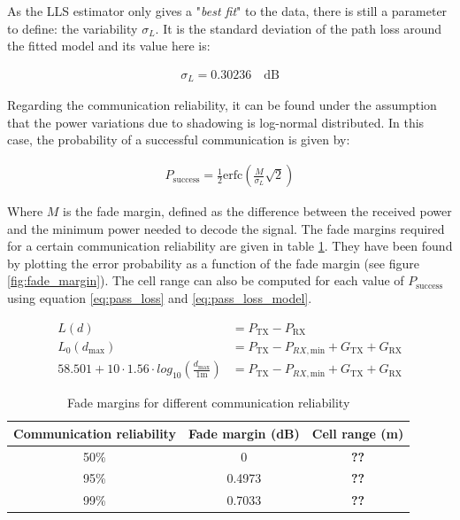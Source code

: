 \documentclass[10pt,a4paper]{ULBreport}
\begin{document}
As the LLS estimator only gives a "\textit{best fit}" to the data, there is still a parameter to define: the variability $\sigma_L$. It is the standard deviation of the path loss around the fitted model and its value here is:

\begin{align*}
    \sigma_L = 0.30236 \quad \text{dB}
\end{align*}

Regarding the communication reliability, it can be found under the assumption that the power variations due to shadowing is log-normal distributed. In this case, the probability of a successful communication is given by:

\begin{align*}
    P_{\text{success}} = \frac{1}{2} \text{erfc}\left(\frac{M}{\sigma_L}\sqrt{2}\right) 
\end{align*}

Where $M$ is the fade margin, defined as the difference between the received power and the minimum power needed to decode the signal. The fade margins required for a certain communication reliability are given in table \ref{tab:fade_margins}. They have been found by plotting the error probability as a function of the fade margin (see figure \ref{fig:fade_margin}). The cell range can also be computed for each value of $P_{\text{success}}$ using equation \ref{eq:pass_loss} and \ref{eq:pass_loss_model}. 

\begin{align*}
    L(d) &= P_{\text{TX}} - P_{\text{RX}}\\
    L_0(d_\text{max}) &= P_{\text{TX}} - P_{RX, \text{min}} + G_{\text{TX}} + G_{\text{RX}}\\
    58.501 + 10 \cdot 1.56 \cdot log_{10} \left(\frac{d_{\text{max}}}{1\text{m}}\right) &= P_{\text{TX}} - P_{RX, \text{min}} + G_{\text{TX}} + G_{\text{RX}}
\end{align*}

\begin{table}[H]
    \centering
    \begin{tabular}{|c|c|c|}
        \hline
        Communication reliability & Fade margin (dB) & Cell range (m) \\ \hline
        50\% & 0 & \textbf{??}\\ \hline
        95\% & 0.4973 & \textbf{??}\\ \hline
        99\% & 0.7033 & \textbf{??}\\ \hline
    \end{tabular}
    \caption{Fade margins for different communication reliability}
    \label{tab:fade_margins}
\end{table}
\end{document}
